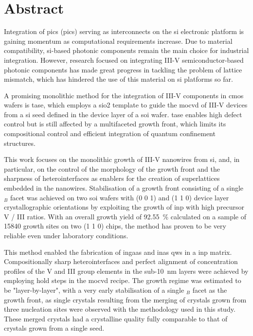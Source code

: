 \chapter{Abstract}

Integration of \acl{pic}s (\acs{pic}s) serving as interconnects on the \acl{si} electronic platform is gaining momentum as computational requirements increase. Due to material compatibility, \acl{si}-based photonic components remain the main choice for industrial integration. However, research focused on integrating III-V semiconductor-based photonic components has made great progress in tackling the problem of lattice mismatch, which has hindered the use of this material on \acl{si} platforms so far.

A promising monolithic method for the integration of III-V components in \acs{cmos} wafers is \acf{tase}, which employs a \acf{sio2} template to guide the \acf{mocvd} of III-V devices from a \acl{si} seed defined in the device layer of a \acf{soi} wafer. \acs{tase} enables high defect control but is still affected by a multifaceted growth front, which limits its compositional control and efficient integration of quantum confinement structures.

This work focuses on the monolithic growth of III-V nanowires from \acl{si}, and, in particular, on the control of the morphology of the growth front and the sharpness of heterointerfaces as enablers for the creation of superlattices embedded in the nanowires. Stabilisation of a growth front consisting of a single \(_B\) facet was achieved on two \acs{soi} wafers with \hkl(0 0 1) and \hkl(1 1 0) device layer crystallographic orientations by exploiting the growth of \acs{inp} with high precursor V / III ratios. With an overall growth yield of \qty{92.55}{\%} calculated on a sample of \num{15840} growth sites on two \hkl(1 1 0) chips, the method has proven to be very reliable even under laboratory conditions.

This method enabled the fabrication of \acs{ingaas} and \acs{inas} \acl{qw}s in a \acs{inp} matrix. Compositionally sharp heterointerfaces and perfect alignment of concentration profiles of the V and III group elements in the sub-\qty{10}{\nano\metre} layers were achieved by employing hold steps in the \acs{mocvd} recipe. The growth regime was estimated to be "layer-by-layer", with a very early stabilisation of a single \(_B\) facet as the growth front, as single crystals resulting from the merging of crystals grown from three nucleation sites were observed with the methodology used in this study. These merged crystals had a crystalline quality fully comparable to that of crystals grown from a single seed.

